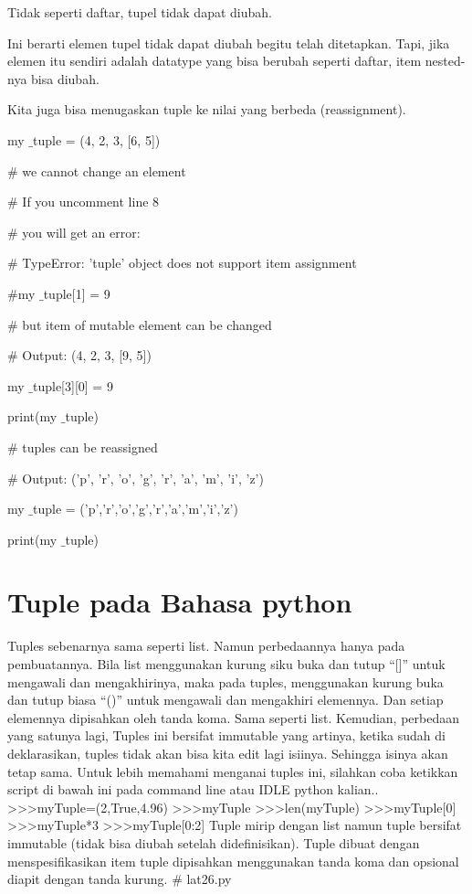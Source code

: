 Tidak seperti daftar, tupel tidak dapat diubah. \par
\vspace{12pt}
Ini berarti elemen tupel tidak dapat diubah begitu telah ditetapkan. Tapi, jika elemen itu sendiri adalah datatype yang bisa berubah seperti daftar, item nested-nya bisa diubah. \par
\vspace{12pt}
Kita juga bisa menugaskan tuple ke nilai yang berbeda (reassignment). \par
\vspace{12pt}
my $  \_  $tuple = (4, 2, 3, [6, 5]) \par
\vspace{12pt}
 $  \#  $ we cannot change an element \par
 $  \#  $ If you uncomment line 8 \par
 $  \#  $ you will get an error: \par
 $  \#  $ TypeError: 'tuple' object does not support item assignment \par
\vspace{12pt}
 $  \#  $my $  \_  $tuple[1] = 9 \par
\vspace{12pt}
 $  \#  $ but item of mutable element can be changed \par
 $  \#  $ Output: (4, 2, 3, [9, 5]) \par
my $  \_  $tuple[3][0] = 9 \par
print(my $  \_  $tuple) \par
\vspace{12pt}
 $  \#  $ tuples can be reassigned \par
 $  \#  $ Output: ('p', 'r', 'o', 'g', 'r', 'a', 'm', 'i', 'z') \par
my $  \_  $tuple = ('p','r','o','g','r','a','m','i','z') \par
print(my $  \_  $tuple) \par
\section {Tuple pada Bahasa python}

Tuples sebenarnya sama seperti list. Namun perbedaannya hanya pada pembuatannya. Bila list menggunakan kurung siku buka dan tutup “[]” untuk mengawali dan mengakhirinya, maka pada tuples, menggunakan kurung buka dan tutup biasa “()” untuk mengawali dan mengakhiri elemennya. Dan setiap elemennya dipisahkan oleh tanda koma. Sama seperti list. Kemudian, perbedaan yang satunya lagi, Tuples ini bersifat immutable yang artinya, ketika sudah di deklarasikan, tuples tidak akan bisa kita edit lagi isiinya. Sehingga isinya akan tetap sama. Untuk lebih memahami menganai tuples ini, silahkan coba ketikkan script di bawah ini pada command line atau IDLE python kalian..
>>>myTuple=(2,True,4.96) 
>>>myTuple 
>>>len(myTuple) 
>>>myTuple[0] 
>>>myTuple*3
 >>>myTuple[0:2]
Tuple mirip dengan list namun tuple bersifat immutable (tidak bisa diubah setelah didefinisikan).
Tuple dibuat dengan menspesifikasikan item tuple dipisahkan menggunakan tanda koma dan opsional diapit dengan tanda kurung.
\# lat26.py

